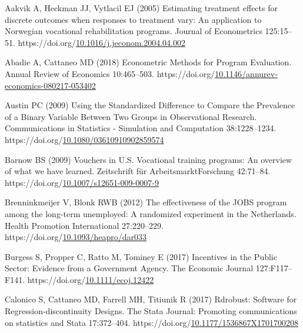 \documentclass[
  11pt]{article}
\newlength{\cslhangindent}
\newenvironment{CSLReferences}[2] %
 {\begin{list}{}{%
  \setlength{\itemindent}{0pt}
  \setlength{\leftmargin}{0pt}
  \setlength{\parsep}{0pt}
  \ifodd #1
   \setlength{\leftmargin}{\cslhangindent}
   \setlength{\itemindent}{-1\cslhangindent}
  \fi
  \setlength{\itemsep}{#2\baselineskip}}}
 {\end{list}}
\begin{document}
\label{refs}
\begin{CSLReferences}{1}{1}
Aakvik A, Heckman JJ, Vytlacil EJ (2005) Estimating treatment effects
for discrete outcomes when responses to treatment vary: An application
to {Norwegian} vocational rehabilitation programs. Journal of
Econometrics 125:15--51.
https://doi.org/\href{https://doi.org/10.1016/j.jeconom.2004.04.002}{10.1016/j.jeconom.2004.04.002}

Abadie A, Cattaneo MD (2018) Econometric {Methods} for {Program
Evaluation}. Annual Review of Economics 10:465--503.
https://doi.org/\href{https://doi.org/10.1146/annurev-economics-080217-053402}{10.1146/annurev-economics-080217-053402}

Austin PC (2009) Using the {Standardized Difference} to {Compare} the
{Prevalence} of a {Binary Variable Between Two Groups} in {Observational
Research}. Communications in Statistics - Simulation and Computation
38:1228--1234.
https://doi.org/\href{https://doi.org/10.1080/03610910902859574}{10.1080/03610910902859574}

Barnow BS (2009) Vouchers in {U}.{S}. Vocational training programs: An
overview of what we have learned. Zeitschrift für ArbeitsmarktForschung
42:71--84.
https://doi.org/\href{https://doi.org/10.1007/s12651-009-0007-9}{10.1007/s12651-009-0007-9}

Brenninkmeijer V, Blonk RWB (2012) The effectiveness of the {JOBS}
program among the long-term unemployed: A randomized experiment in the
{Netherlands}. Health Promotion International 27:220--229.
https://doi.org/\href{https://doi.org/10.1093/heapro/dar033}{10.1093/heapro/dar033}

Burgess S, Propper C, Ratto M, Tominey E (2017) Incentives in the
{Public Sector}: {Evidence} from a {Government Agency}. The Economic
Journal 127:F117--F141.
https://doi.org/\href{https://doi.org/10.1111/ecoj.12422}{10.1111/ecoj.12422}

Calonico S, Cattaneo MD, Farrell MH, Titiunik R (2017) Rdrobust:
{Software} for {Regression-discontinuity Designs}. The Stata Journal:
Promoting communications on statistics and Stata 17:372--404.
https://doi.org/\href{https://doi.org/10.1177/1536867X1701700208}{10.1177/1536867X1701700208}


\end{CSLReferences}
\end{document}
